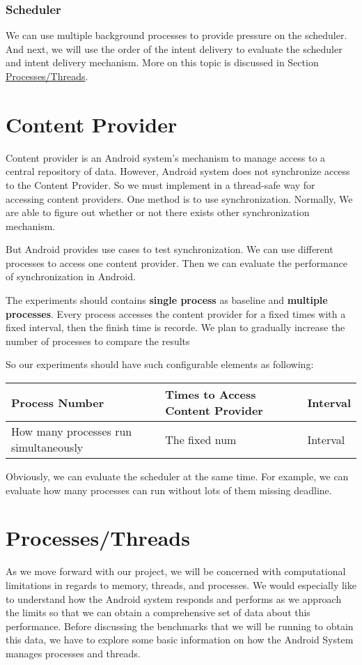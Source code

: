 \documentclass[11pt]{article}
\begin{document}
\subsubsection{Scheduler}
\label{sec-3-2-3}
We can use multiple background processes to provide pressure on the scheduler.
And next, we will use the order of the intent delivery to evaluate the scheduler and intent delivery mechanism. More on this topic is discussed in Section \hyperref[Processes/Threads]{Processes/Threads}.

\section{Content Provider}
\label{sec-4}
Content provider is an Android system's mechanism to manage access to a central repository of data.
However, Android system does not synchronize access to the Content Provider.
So we must implement in a thread-safe way for accessing content providers.
One method is to use synchronization. Normally, We are able to figure out whether or not there exists other synchronization mechanism.

But Android provides use cases to test synchronization. We can use different processes to access one content provider.
Then we can evaluate the performance of synchronization in Android.

The experiments should contains \textbf{single process} as baseline and \textbf{multiple processes}.
Every process accesses the content provider for a fixed times with a fixed interval, then the finish time is recorde.
We plan to gradually increase the number of processes to compare the results

So our experiments should have such configurable elements as following:

\begin{center}
\begin{tabular}{l|l|l}
Process Number & Times to Access Content Provider & Interval\\
\hline
How many processes run simultaneously & The fixed num & Interval\\
\end{tabular}
\end{center}

Obviously, we can evaluate the scheduler  at the same time.
For example, we can evaluate how many processes can run without lots of them missing deadline.

\section{\label{Processes/Threads}Processes/Threads}
\label{sec-5}
As we move forward with our project, we will be concerned with computational limitations in regards to memory, threads, and processes.  We would especially like to understand how the Android system responds and performs as we approach the limits so that we can obtain a comprehensive set of data about this performance.  Before discussing the benchmarks that we will be running to obtain this data, we have to explore some basic information on how the Android System manages processes and threads.
\end{document}
